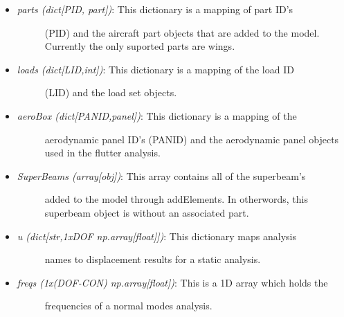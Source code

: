 \documentclass[letterpaper,10pt,english]{sphinxmanual}
\begin{document}
\begin{fulllineitems}
\begin{itemize}
\begin{description}
\end{description}

\item {} \begin{description}
\item[{\emph{parts (dict{[}PID, part{]})}: This dictionary is a mapping of part ID's}] \leavevmode
(PID) and the aircraft part objects that are added to the model.
Currently the only suported parts are wings.

\end{description}

\item {} \begin{description}
\item[{\emph{loads (dict{[}LID,int{]})}: This dictionary is a mapping of the load ID}] \leavevmode
(LID) and the load set objects.

\end{description}

\item {} \begin{description}
\item[{\emph{aeroBox (dict{[}PANID,panel{]})}: This dictionary is a mapping of the}] \leavevmode
aerodynamic panel ID's (PANID) and the aerodynamic panel objects used
in the flutter analysis.

\end{description}

\item {} \begin{description}
\item[{\emph{SuperBeams (array{[}obj{]})}: This array contains all of the superbeam's}] \leavevmode
added to the model through addElements. In otherwords, this superbeam
object is without an associated part.

\end{description}

\item {} \begin{description}
\item[{\emph{u (dict{[}str,1xDOF np.array{[}float{]}{]})}: This dictionary maps analysis}] \leavevmode
names to displacement results for a static analysis.

\end{description}

\item {} \begin{description}
\item[{\emph{freqs (1x(DOF-CON) np.array{[}float{]})}: This is a 1D array which holds the}] \leavevmode
frequencies of a normal modes analysis.


\end{description}
\end{itemize}
\end{fulllineitems}
\end{document}

